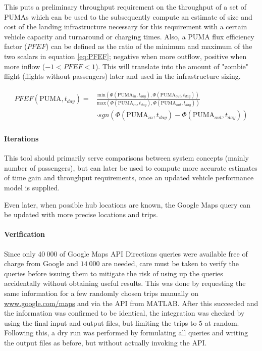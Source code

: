 This puts a preliminary throughput requirement on the throughput of a set of PUMAs which can be used to the subsequently compute an estimate of size and cost of the landing infrastructure necessary for this requirement with a certain vehicle capacity and turnaround or charging times. Also, a PUMA flux efficiency factor ($PFEF$) can be defined as the ratio of the minimum and maximum of the two scalars in equation \ref{eq:PFEF}; negative when more outflow, positive when more inflow ($-1 < PFEF < 1$). This will translate into the amount of "zombie" flight (flights without passengers) later and used in the infrastructure sizing.

\begin{align} \label{eq:PFEF}
    \begin{split}
        PFEF(\text{PUMA}, t_{day}) = &\frac{\text{min} 
        \left(
            \Phi(\text{PUMA}_{in}, t_{day}),
            \Phi(\text{PUMA}_{out}, t_{day})
        \right)
        }{\text{max} 
        \left(
            \Phi(\text{PUMA}_{in}, t_{day}),
            \Phi(\text{PUMA}_{out}, t_{day})
        \right)
        } \\
        &\cdot sgn ( \Phi(\text{PUMA}_{in}, t_{day}) - \Phi(\text{PUMA}_{out}, t_{day}) )
    \end{split}
\end{align}

\paragraph{Iterations}

This tool should primarily serve comparisons between system concepts (mainly number of passengers), but can later be used to compute more accurate estimates of time gain and throughput requirements, once an updated vehicle performance model is supplied.

Even later, when possible hub locations are known, the Google Maps query can be updated with more precise locations and trips.


\paragraph{Verification}

Since only $40\ 000$ of Google Maps API Directions queries were available free of charge from Google and $14\ 000$ are needed, care must be taken to verify the queries before issuing them to mitigate the risk of using up the queries accidentally without obtaining useful results. This was done by requesting the same information for a few randomly chosen trips manually on \url{www.google.com/maps} and via the API from MATLAB. After this succeeded and the information was confirmed to be identical, the integration was checked by using the final input and output files, but limiting the trips to 5 at random. Following this, a dry run was performed by formulating all queries and writing the output files as before, but without actually invoking the API. 

